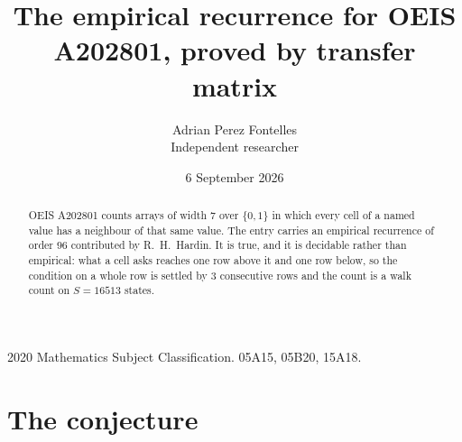 \documentclass[11pt,a4paper]{article}
\title{The empirical recurrence for OEIS A202801, proved by transfer matrix}
\author{Adrian Perez Fontelles\\ \small Independent researcher}
\date{6 September 2026}
\theoremstyle{plain}
\theoremstyle{definition}
\begin{document}
\maketitle

\begin{abstract}
OEIS A202801 counts arrays of width $7$ over $\{0,1\}$ in which every cell of a named value has a neighbour of that same value. The entry carries an
empirical recurrence of order $96$ contributed by R.~H.~Hardin. It is true, and it is
decidable rather than empirical: what a cell asks reaches one row above it and one row below, so the
condition on a whole row is settled by $3$ consecutive rows and the count is a walk
count on $S=16513$ states.
\end{abstract}

\noindent\small 2020 Mathematics Subject Classification. 05A15, 05B20, 15A18.\normalsize

\section{The conjecture}
\end{document}
